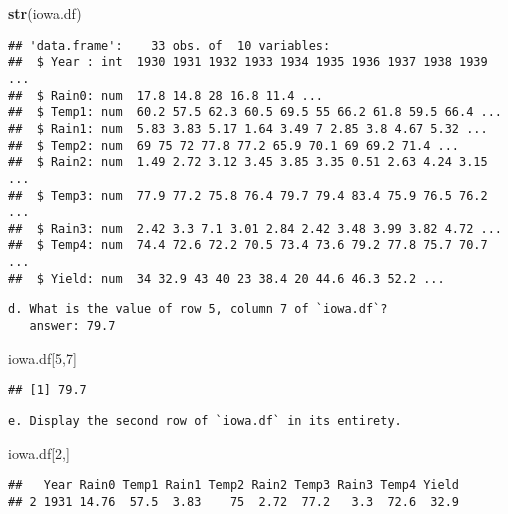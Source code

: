 \documentclass[
]{article}
\newenvironment{Shaded}{\begin{snugshade}}{\end{snugshade}}
\newcommand{\DecValTok}[1]{\textcolor[rgb]{0.00,0.00,0.81}{#1}}
\newcommand{\KeywordTok}[1]{\textcolor[rgb]{0.13,0.29,0.53}{\textbf{#1}}}
\newcommand{\NormalTok}[1]{#1}
\begin{document}
\begin{Shaded}
\begin{Highlighting}[]
\KeywordTok{str}\NormalTok{(iowa.df)}
\end{Highlighting}
\end{Shaded}

\begin{verbatim}
## 'data.frame':    33 obs. of  10 variables:
##  $ Year : int  1930 1931 1932 1933 1934 1935 1936 1937 1938 1939 ...
##  $ Rain0: num  17.8 14.8 28 16.8 11.4 ...
##  $ Temp1: num  60.2 57.5 62.3 60.5 69.5 55 66.2 61.8 59.5 66.4 ...
##  $ Rain1: num  5.83 3.83 5.17 1.64 3.49 7 2.85 3.8 4.67 5.32 ...
##  $ Temp2: num  69 75 72 77.8 77.2 65.9 70.1 69 69.2 71.4 ...
##  $ Rain2: num  1.49 2.72 3.12 3.45 3.85 3.35 0.51 2.63 4.24 3.15 ...
##  $ Temp3: num  77.9 77.2 75.8 76.4 79.7 79.4 83.4 75.9 76.5 76.2 ...
##  $ Rain3: num  2.42 3.3 7.1 3.01 2.84 2.42 3.48 3.99 3.82 4.72 ...
##  $ Temp4: num  74.4 72.6 72.2 70.5 73.4 73.6 79.2 77.8 75.7 70.7 ...
##  $ Yield: num  34 32.9 43 40 23 38.4 20 44.6 46.3 52.2 ...
\end{verbatim}

\begin{verbatim}
d. What is the value of row 5, column 7 of `iowa.df`?
   answer: 79.7
\end{verbatim}

\begin{Shaded}
\begin{Highlighting}[]
\NormalTok{iowa.df[}\DecValTok{5}\NormalTok{,}\DecValTok{7}\NormalTok{]}
\end{Highlighting}
\end{Shaded}

\begin{verbatim}
## [1] 79.7
\end{verbatim}

\begin{verbatim}
e. Display the second row of `iowa.df` in its entirety.
\end{verbatim}

\begin{Shaded}
\begin{Highlighting}[]
\NormalTok{iowa.df[}\DecValTok{2}\NormalTok{,]}
\end{Highlighting}
\end{Shaded}

\begin{verbatim}
##   Year Rain0 Temp1 Rain1 Temp2 Rain2 Temp3 Rain3 Temp4 Yield
## 2 1931 14.76  57.5  3.83    75  2.72  77.2   3.3  72.6  32.9
\end{verbatim}
\end{document}
